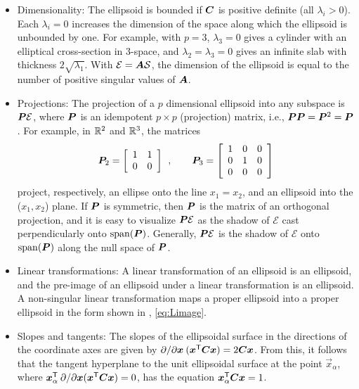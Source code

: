 \begin{itemize}
 \item Dimensionality: The ellipsoid is bounded if $\bm{C}$ is positive definite (all $\lambda_i > 0$).
 Each $\lambda_i = 0$ increases the dimension of the space along which the ellipsoid is unbounded by one.
For example, with $p=3$, $\lambda_3=0$ gives a
cylinder with an elliptical cross-section in 3-space, and  $\lambda_2 = \lambda_3=0$ gives an infinite slab with thickness $2 \sqrt{\lambda_1}$. With $\mathcal{E} = \bm{A} \mathcal{S}$, the dimension of the ellipsoid is equal to the number of positive singular values of $\bm{A}$.
 \item Projections: The projection of a $p$ dimensional ellipsoid into any subspace
is $\bm{P} \mathcal{E}$, where
$\bm{P}$ is an idempotent $p \times p$ (projection) matrix, i.e., $\bm{P} \bm{P}= \bm{P}^2 = \bm{P}$.
For example, in $\mathbb{R}^{2}$ and $\mathbb{R}^{3}$,
the matrices
\[
\bm{P}_2 =
\left[
\begin{array}{cc}
 1 & 1  \\
 0 & 0  \\
\end{array}
\right]
\:\: , \quad\quad
\bm{P}_3 =
\left[
\begin{array}{ccc}
 1 & 0 & 0 \\
 0 & 1 & 0 \\
 0 & 0 & 0 \\
\end{array}
\right]
\]
project, respectively, an ellipse onto the line $x_1 = x_2$, and an ellipsoid into the ($x_1, x_2$) plane.  If $\bm{P}$ is symmetric, then $\bm{P}$ is the matrix of an orthogonal projection, and it is easy to visualize  $\bm{P} \mathcal{E}$ as the shadow of  $\mathcal{E}$ cast perpendicularly onto  $\mathrm{span}(\bm{P})$. Generally,  $\bm{P} \mathcal{E}$ is the shadow of $\mathcal{E}$  onto  $\mathrm{span}(\bm{P})$ along the null space of $\bm{P}$.

 \item Linear transformations: A linear transformation of an ellipsoid is an ellipsoid, and the pre-image of an ellipsoid under a linear transformation is an ellipsoid.  
A non-singular linear transformation maps a proper ellipsoid into a proper ellipsoid in the form shown in , \eqref{eq:Limage}. 

 \item Slopes and tangents: The slopes of the ellipsoidal surface in the directions of the coordinate
 axes are given by $\partial / \partial \bm{x} \: (\bm{x}^\mathsf{T} \bm{C} \bm{x}) = 2 \bm{C} \bm{x}$.
 From this, it follows that the tangent hyperplane to the unit ellipsoidal surface at the point
 $\vec{x}_\alpha$, where $\bm{x}_\alpha^\mathsf{T} \: \partial / \partial \bm{x} (\bm{x}^\mathsf{T} \bm{C} \bm{x}) = 0$,
 has the equation $\bm{x}_\alpha ^\mathsf{T} \bm{C} \bm{x} = 1$.
\end{itemize}

